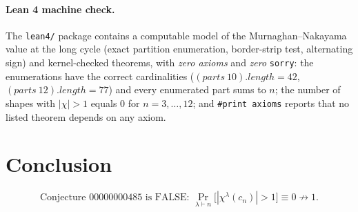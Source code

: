 \documentclass[11pt]{article}
\newcommand{\lc}{c_n}
\newcommand{\chl}{\chi^\lambda}
\begin{document}
\paragraph{Lean 4 machine check.} The \texttt{lean4/} package contains a
computable model of the Murnaghan--Nakayama value at the long cycle (exact
partition enumeration, border-strip test, alternating sign) and
kernel-checked theorems, with \emph{zero axioms} and \emph{zero}
\texttt{sorry}: the enumerations have the correct cardinalities
($(parts\ 10).length = 42$, $(parts\ 12).length = 77$) and every enumerated
part sums to $n$; the number of shapes with $|\chi| > 1$ equals $0$ for
$n = 3,\dots,12$; and \texttt{\#print axioms} reports that no listed theorem
depends on any axiom.

\section{Conclusion}

\[
\boxed{\text{Conjecture 00000000485 is FALSE: } \Pr_{\lambda\vdash n}\bigl[|\chl(\lc)|>1\bigr] \equiv 0 \not\to 1.}
\]
\end{document}
